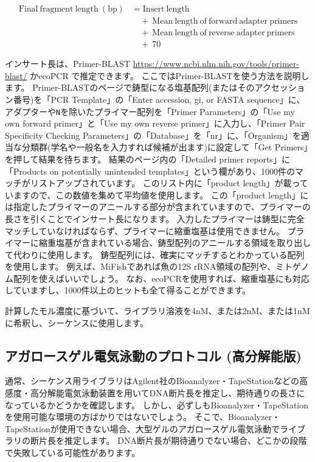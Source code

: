 \documentclass[titlepage,10pt,a4paper,uplatex]{jsbook}
\begin{document}
\begin{align*}
\mathrm{Final~fragment~length~(bp)} &= \mathrm{Insert~length} \\
            &\quad + \ \mathrm{Mean~length~of~forward~adapter~primers} \\
            &\quad + \ \mathrm{Mean~length~of~reverse~adapter~primers} \\
            &\quad + \ 70
\end{align*}

インサート長は、Primer-BLAST \url{https://www.ncbi.nlm.nih.gov/tools/primer-blast/} かecoPCR \citep{Bellemain2010}で推定できます。
ここではPrimer-BLASTを使う方法を説明します。
Primer-BLASTのページで鋳型になる塩基配列(またはそのアクセッション番号)を「PCR Template」の「Enter accession, gi, or FASTA sequence」に、アダプターや\texttt{N}を除いたプライマー配列を「Primer Parameters」の「Use my own forward primer」と「Use my own reverse primer」に入力し、「Primer Pair Specificity Checking Parameters」の「Database」を「nr」に、「Organism」を適当な分類群(学名や一般名を入力すれば候補が出ます)に設定して「Get Primers」を押して結果を待ちます。
結果のページ内の「Detailed primer reports」に「Products on potentially unintended templates」という欄があり、1000件のマッチがリストアップされています。
このリスト内に「product length」が載っていますので、この数値を集めて平均値を使用します。
この「product length」には指定したプライマーのアニールする部分が含まれていますので、プライマーの長さを引くことでインサート長になります。
入力したプライマーは鋳型に完全マッチしていなければならず、プライマーに縮重塩基は使用できません。
プライマーに縮重塩基が含まれている場合、鋳型配列のアニールする領域を取り出して代わりに使用します。
鋳型配列には、確実にマッチするとわかっている配列を使用します。
例えば、MiFishであれば魚の12S rRNA領域の配列や、ミトゲノム配列を使えばいいでしょう。
なお、ecoPCRを使用すれば、縮重塩基にも対応していますし、1000件以上のヒットも全て得ることができます。

計算したモル濃度に基づいて、ライブラリ溶液を4nM、または2nM、または1nMに希釈し、シーケンスに使用します。

\subsection{アガロースゲル電気泳動のプロトコル (高分解能版)}

通常、シーケンス用ライブラリはAgilent社のBioanalyzer・TapeStationなどの高感度・高分解能電気泳動装置を用いてDNA断片長を推定し、期待通りの長さになっているかどうかを確認します。
しかし、必ずしもBioanalyzer・TapeStationを使用可能な環境の方ばかりではないでしょう。
そこで、Bioanalyzer・TapeStationが使用できない場合、大型ゲルのアガロースゲル電気泳動でライブラリの断片長を推定します。
DNA断片長が期待通りでない場合、どこかの段階で失敗している可能性があります。
\end{document}
